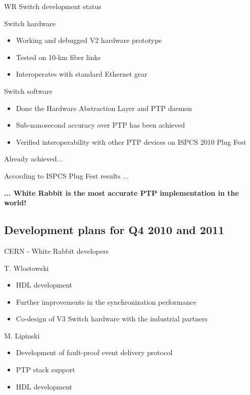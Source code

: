 \documentclass[xcolor=dvipsnames]{beamer}
\begin{document}
\begin{frame}{WR Switch development status}
	\begin{block}{Switch hardware}
          \begin{itemize}
            \item Working and debugged V2 hardware prototype
            \item Tested on 10-km fiber links
            \item Interoperates with standard Ethernet gear
            \end{itemize}
            \end{block}

	\begin{block}{Switch software}
          \begin{itemize}
            \item Done the Hardware Abstraction Layer and PTP daemon 
            \item Sub-nanosecond accuracy over PTP has been achieved
            \item Verified interoperability with other PTP devices on ISPCS 2010 Plug Fest
            \end{itemize}
          \end{block}
\end{frame}

\begin{frame}{Already achieved...}
  \begin{block}{According to ISPCS Plug Fest results ...}
    \begin{center}
      \textbf{... White Rabbit is the most accurate PTP implementation in the world!}
  \end{center}
  \end{block}
\end{frame}

\subsection{Development plans for Q4 2010 and 2011}

\begin{frame}{CERN - White Rabbit developers}
  \begin{block}{T. Wlostowski}
    \begin{itemize} 
      \item HDL development 
      \item Further improvements in the synchronization performance
      \item Co-design of V3 Switch hardware with the industrial partners
      \end{itemize}
    \end{block}
  \begin{block}{M. Lipinski}
    \begin{itemize} 
      \item Development of fault-proof event delivery protocol
      \item PTP stack support
      \item HDL development
      \end{itemize}
    \end{block}
\end{frame}
\end{document}
